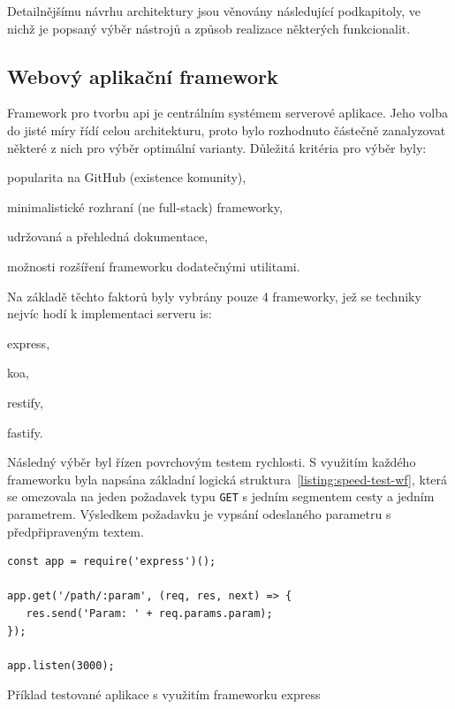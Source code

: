 Detailnějšímu návrhu architektury jsou věnovány následující podkapitoly, ve nichž je popsaný výběr nástrojů a způsob realizace některých funkcionalit.




\subsection{Webový aplikační framework}

Framework pro tvorbu \gls{api} je centrálním systémem serverové aplikace. Jeho volba do jisté míry řídí celou architekturu, proto bylo rozhodnuto částečně zanalyzovat některé z nich pro výběr optimální varianty. Důležitá kritéria pro výběr byly:

\begin{ulnar}
   \item popularita na GitHub (existence komunity),
   \item minimalistické rozhraní (ne full-stack) frameworky,
   \item udržovaná a přehledná dokumentace,
   \item možnosti rozšíření frameworku dodatečnými utilitami.
\end{ulnar}


Na základě těchto faktorů byly vybrány pouze 4 frameworky, jež se techniky nejvíc hodí k implementaci serveru \gls{is}:

\begin{ulnar}
   \item express,
   \item koa,
   \item restify,
   \item fastify.
\end{ulnar}

Následný výběr byl řízen povrchovým testem rychlosti. S využitím každého frameworku byla napsána základní logická struktura~\ref{listing:speed-test-wf}, která se omezovala na jeden požadavek typu \texttt{GET} s jedním segmentem cesty a jedním parametrem. Výsledkem požadavku je vypsání odeslaného parametru s předpřipraveným textem.

\begin{fig:code}
	\begin{verbatim}
const app = require('express')();

app.get('/path/:param', (req, res, next) => {
   res.send('Param: ' + req.params.param);
});

app.listen(3000);
   \end{verbatim}
   \caption{Příklad testované aplikace s využitím frameworku express}\label{listing:speed-test-wf}
\end{fig:code}


